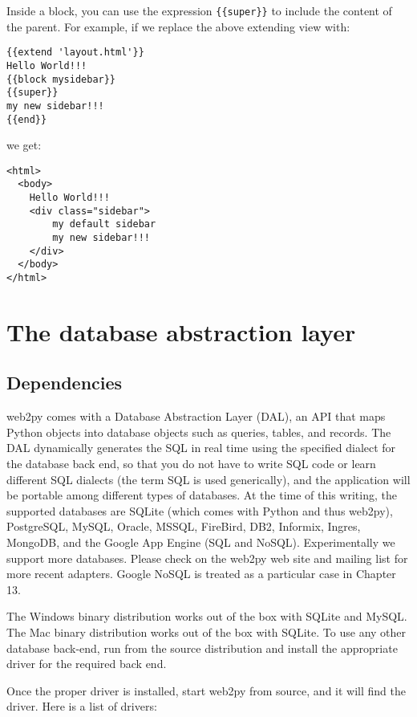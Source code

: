 \documentclass[justified,sixbynine,notoc]{tufte-book}
\def\ft{\small\tt}
\def\inxx#1{\index{#1}}
\begin{document}
\begin{fullwidth}
\inxx{super}

Inside a block, you can use the expression {\ft \{\{super\}\}} to include the content of the parent. For example, if we replace the above extending view with:

\begin{lstlisting}[keywords={}]
{{extend 'layout.html'}}
Hello World!!!
{{block mysidebar}}
{{super}}
my new sidebar!!!
{{end}}
\end{lstlisting}
\noindent we get:

\begin{lstlisting}[keywords={}]
<html>
  <body>
    Hello World!!!
    <div class="sidebar">
        my default sidebar
        my new sidebar!!!
    </div>
  </body>
</html>
\end{lstlisting}

\goodbreak\chapter{The database abstraction layer}

\inxx{DAL}

\goodbreak\section{Dependencies}
\noindent web2py comes with a Database Abstraction Layer (DAL), an API that maps Python objects into database objects such as queries, tables, and records. The DAL dynamically generates the SQL in real time using the specified dialect for the database back end, so that you do not have to write SQL code or learn different SQL dialects (the term SQL is used generically), and the application will be portable among different types of databases. At the time of this writing, the supported databases are SQLite (which comes with Python and thus web2py), PostgreSQL, MySQL, Oracle, MSSQL, FireBird, DB2, Informix, Ingres, MongoDB, and the Google App Engine (SQL and NoSQL). Experimentally we support more databases. Please check on the web2py web site and mailing list for more recent adapters. Google NoSQL is treated as a particular case in Chapter 13.

The Windows binary distribution works out of the box with SQLite and MySQL. The Mac binary distribution works out of the box with SQLite.
To use any other database back-end, run from the source distribution and install the appropriate driver for the required back end.
\inxx{database drivers}

Once the proper driver is installed, start web2py from source, and it will find the driver. Here is a list of drivers:


\end{fullwidth}
\end{document}
